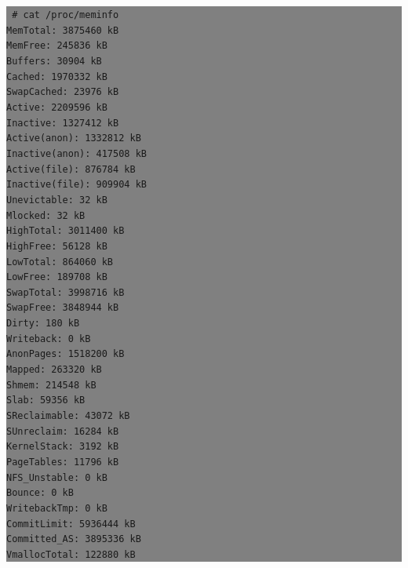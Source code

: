 \documentclass[12pt]{article}
\begin{document}
\colorbox{grey}{\parbox[t]{0.95\linewidth}{ \vspace*{0.5cm} { 
{\tt
\# cat /proc/meminfo \\
MemTotal:        3875460 kB\\
MemFree:          245836 kB\\
Buffers:           30904 kB\\
Cached:          1970332 kB\\
SwapCached:        23976 kB\\
Active:          2209596 kB\\
Inactive:        1327412 kB\\
Active(anon):    1332812 kB\\
Inactive(anon):   417508 kB\\
Active(file):     876784 kB\\
Inactive(file):   909904 kB\\
Unevictable:          32 kB\\
Mlocked:              32 kB\\
HighTotal:       3011400 kB\\
HighFree:          56128 kB\\
LowTotal:         864060 kB\\
LowFree:          189708 kB\\
SwapTotal:       3998716 kB\\
SwapFree:        3848944 kB\\
Dirty:               180 kB\\
Writeback:             0 kB\\
AnonPages:       1518200 kB\\
Mapped:           263320 kB\\
Shmem:            214548 kB\\
Slab:              59356 kB\\
SReclaimable:      43072 kB\\
SUnreclaim:        16284 kB\\
KernelStack:        3192 kB\\
PageTables:        11796 kB\\
NFS\_Unstable:          0 kB\\
Bounce:                0 kB\\
WritebackTmp:          0 kB\\
CommitLimit:     5936444 kB\\
Committed\_AS:    3895336 kB\\
VmallocTotal:     122880 kB\\
}}}}
\end{document}
